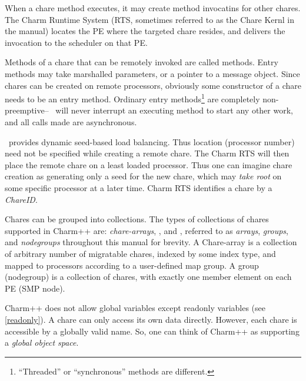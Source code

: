 When a chare method executes, it may create  method invocatins for other
chares. The Charm Runtime System (RTS, sometimes referred to as the
Chare Kernl in the manual) locates the PE where the targeted chare
resides, and delivers the invocation to the scheduler on that PE. 

Methods of a chare that can be remotely invoked are called
 methods.  Entry methods may take marshalled
parameters, or a pointer to a message object.  Since  chares can
be created on remote processors, obviously some constructor of a chare needs
to be an entry method.  Ordinary entry methods\footnote{``Threaded'' or
``synchronous'' methods are different.} are completely non-preemptive--
\charmpp\ will never interrupt an executing method to start any other work,
and all calls made are asynchronous.

\charmpp\ provides dynamic seed-based load balancing. Thus location (processor
number) need not be specified while creating a
remote chare. The Charm RTS will then place the remote
chare on a least loaded processor. Thus one can imagine chare creation
as generating only a seed for the new chare, which may {\em take root}
on some specific processor at a later time. Charm RTS identifies
a chare by a {\em ChareID}.  


Chares can be grouped into collections. The types of collections of
chares supported in Charm++ are: {\em chare-arrays}, , and , referred
to as {\em arrays}, {\em groups}, and {\em nodegroups} throughout this
manual for brevity. A Chare-array is a collection of arbitrary number
of migratable chares, indexed by some index type, and mapped to
processors according to a user-defined map group. A group (nodegroup)
is a collection of chares, with exactly one member element on each PE
(SMP node).

Charm++ does not allow global variables except readonly variables
(see \ref{readonly}). A chare can only access its own data directly.
However, each chare is accessible by a globally valid name. So, one
can think of Charm++ as supporting a {\em global object space}.



